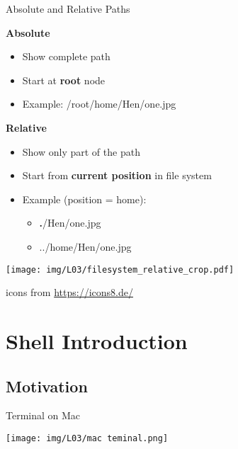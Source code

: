 \documentclass[hyperref={pdfpagelabels=false},aspectratio=169]{beamer}
\begin{document}
\begin{frame}{Absolute and Relative Paths}
    \begin{minipage}{0.59\textwidth}

        \textbf{Absolute} 
        \begin{itemize}
            \item Show complete path
            \item Start at \textbf{root} node
            \item Example: /\textcolor{THviolett}{root}/\textcolor{THrot}{home}/\textcolor{THorange}{Hen}/\textcolor{THviolett}{one.jpg}
        \end{itemize}
        
        \vspace{15pt}
        \textbf{Relative} 
        \begin{itemize}
            \item Show only part of the path
            \item Start from \textbf{current position} in file system
            \item Example (position = home):             \begin{itemize}
                \item \textbf{.}/\textcolor{THorange}{Hen}/\textcolor{THviolett}{one.jpg}
                \item ../\textcolor{THrot}{home}/\textcolor{THorange}{Hen}/\textcolor{THviolett}{one.jpg}
            \end{itemize}
        \end{itemize}
    \end{minipage}
    \begin{minipage}{0.4\textwidth}
        \centering
        \texttt{[image: img/L03/filesystem\_relative\_crop.pdf]}
        
        \tiny
        icons from \url{https://icons8.de/}
    \end{minipage}

\end{frame}


\section{Shell Introduction}

\begin{frame}
	\tableofcontents[currentsection]
\end{frame}


\subsection*{Motivation}
\begin{frame}{Terminal on Mac}

    \centering
    \texttt{[image: img/L03/mac teminal.png]}
\end{frame}
\end{document}
